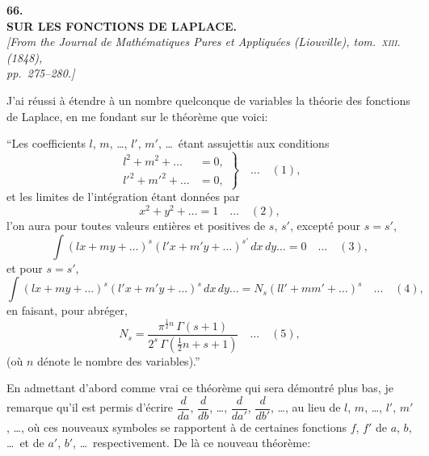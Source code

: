 \documentclass[11pt]{article}
\begin{document}
\bigskip

\begin{center}
\textbf{\large 66.}\\[0.7em]
\textbf{\large SUR LES FONCTIONS DE LAPLACE.}\\[0.5em]
\textit{[From the Journal de Math\'ematiques Pures et Appliqu\'ees (Liouville), tom.~\textsc{xiii}. (1848),\\
pp.~275--280.]}
\end{center}

\medskip

J'ai r\'eussi \`a \'etendre \`a un nombre quelconque de variables la th\'eorie des fonctions
de Laplace, en me fondant sur le th\'eor\`eme que voici:

\medskip
``Les coefficients $l$, $m$, \ldots, $l'$, $m'$, \ldots\ \'etant assujettis aux conditions
\[
\left.\begin{aligned}
l^{2} + m^{2} + \ldots &= 0,\\
l'^{2} + m'^{2} + \ldots &= 0,
\end{aligned}\right\}\quad\ldots\quad (1),
\]
et les limites de l'int\'egration \'etant donn\'ees par
\[
x^{2} + y^{2} + \ldots = 1\quad\ldots\quad (2),
\]
l'on aura pour toutes valeurs enti\`eres et positives de $s$, $s'$, except\'e pour $s = s'$,
\[
\int (lx + my + \ldots)^{s}(l'x + m'y + \ldots)^{s'}\,dx\,dy\ldots = 0\quad\ldots\quad (3),
\]
et pour $s = s'$,
\[
\int (lx + my + \ldots)^{s}(l'x + m'y + \ldots)^{s}\,dx\,dy\ldots = N_{s}(ll' + mm' + \ldots)^{s}\quad\ldots\quad (4),
\]
en faisant, pour abr\'eger,
\[
N_{s} = \frac{\pi^{\tfrac{1}{2}n}\,\Gamma(s + 1)}{2^{s}\,\Gamma(\tfrac{1}{2}n + s + 1)}\quad\ldots\quad (5),
\]
(o\`u $n$ d\'enote le nombre des variables).''

\medskip
En admettant d'abord comme vrai ce th\'eor\`eme qui sera d\'emontr\'e plus bas, je
remarque qu'il est permis d'\'ecrire $\dfrac{d}{da}$, $\dfrac{d}{db}$, \ldots, $\dfrac{d}{da'}$, $\dfrac{d}{db'}$, \ldots, au lieu de $l$, $m$, \ldots, $l'$, $m'$, \ldots,
o\`u ces nouveaux symboles se rapportent \`a de certaines fonctions $f$, $f'$ de $a$, $b$, \ldots\ et de
$a'$, $b'$, \ldots\ respectivement. De l\`a ce nouveau th\'eor\`eme:

\end{document}
